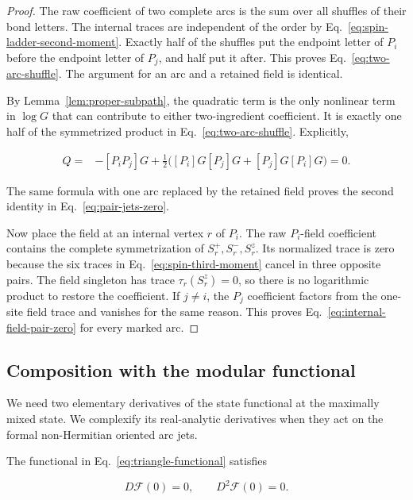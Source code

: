 \begin{proof}
The raw coefficient of two complete arcs is the sum over all shuffles of
their bond letters.  The internal traces are independent of the order by
Eq.~\eqref{eq:spin-ladder-second-moment}.  Exactly half of the shuffles put
the endpoint letter of $P_i$ before the endpoint letter of $P_j$, and half
put it after.  This proves Eq.~\eqref{eq:two-arc-shuffle}.  The argument for
an arc and a retained field is identical.

By Lemma~\ref{lem:proper-subpath}, the quadratic term is the only nonlinear
term in $\log G$ that can contribute to either two-ingredient coefficient.
It is exactly one half of the symmetrized product in
Eq.~\eqref{eq:two-arc-shuffle}.  Explicitly,

\begin{align}
 [P_iP_j]Q
 ={}&-[P_iP_j]G
 +\frac12\bigl([P_i]G[P_j]G+[P_j]G[P_i]G\bigr)
 =0.
 \label{eq:two-arc-Q-cancellation}
\end{align}

The same formula with one arc replaced by the retained field proves the
second identity in Eq.~\eqref{eq:pair-jets-zero}.

Now place the field at an internal vertex $r$ of $P_i$.  The raw
$P_i$-field coefficient contains the complete symmetrization of
$S_r^+,S_r^-,S_r^z$.  Its normalized trace is zero because the six traces in
Eq.~\eqref{eq:spin-third-moment} cancel in three opposite pairs.  The field
singleton has trace $\tau_r(S_r^z)=0$, so there is no logarithmic product to
restore the coefficient.  If $j\ne i$, the $P_j$ coefficient factors from
the one-site field trace and vanishes for the same reason.  This proves
Eq.~\eqref{eq:internal-field-pair-zero} for every marked arc.
\end{proof}

\subsection{Composition with the modular functional}

We need two elementary derivatives of the state functional at the maximally
mixed state.  We complexify its real-analytic derivatives when they act on
the formal non-Hermitian oriented arc jets.

\begin{lemma}
\label{lem:triangle-functional-low-derivatives}
The functional in Eq.~\eqref{eq:triangle-functional} satisfies

\begin{equation}
 D\mathcal F(0)=0,
 \qquad
 D^2\mathcal F(0)=0.
 \label{eq:F-first-two-zero}
\end{equation}
\end{lemma}

